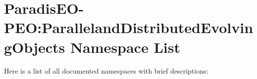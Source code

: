 \section{Paradis\-EO-PEO:Paralleland\-Distributed\-Evolving\-Objects Namespace List}
Here is a list of all documented namespaces with brief descriptions:\begin{CompactList}
\item{}
\end{CompactList}

